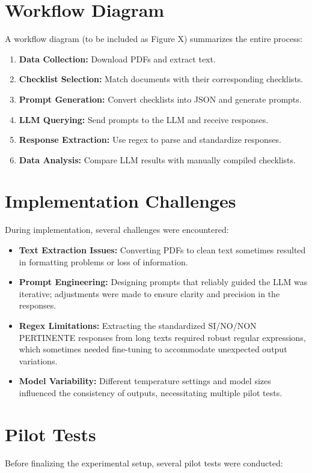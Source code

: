 \documentclass[../main.tex]{subfiles}
\begin{document}
\section*{Workflow Diagram}
A workflow diagram (to be included as Figure X) summarizes the entire process:
\begin{enumerate}
    \item \textbf{Data Collection:} Download PDFs and extract text.
    \item \textbf{Checklist Selection:} Match documents with their corresponding checklists.
    \item \textbf{Prompt Generation:} Convert checklists into JSON and generate prompts.
    \item \textbf{LLM Querying:} Send prompts to the LLM and receive responses.
    \item \textbf{Response Extraction:} Use regex to parse and standardize responses.
    \item \textbf{Data Analysis:} Compare LLM results with manually compiled checklists.
\end{enumerate}
 

\section*{Implementation Challenges}
During implementation, several challenges were encountered:

\begin{itemize}
    \item \textbf{Text Extraction Issues:}
 Converting PDFs to clean text sometimes resulted in formatting problems or loss of information.
    \item \textbf{Prompt Engineering:}
 Designing prompts that reliably guided the LLM was iterative; adjustments were made to ensure clarity and precision in the responses.
    \item \textbf{Regex Limitations:}
 Extracting the standardized SI/NO/NON PERTINENTE responses from long texts required robust regular expressions, which sometimes needed fine-tuning to accommodate unexpected output variations.
    \item \textbf{Model Variability:}
 Different temperature settings and model sizes influenced the consistency of outputs, necessitating multiple pilot tests.
\end{itemize}
 

\section*{Pilot Tests}
Before finalizing the experimental setup, several pilot tests were conducted:
\end{document}
